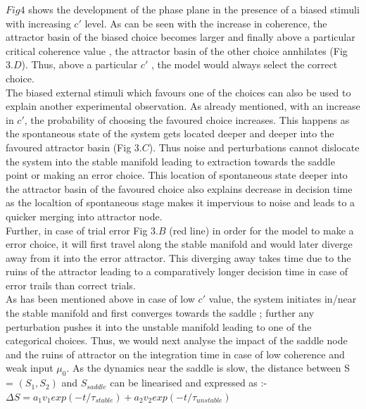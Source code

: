 $Fig 4$ shows the development of the phase plane in the presence of a biased stimuli with increasing $c \prime $ level. As can be seen with the increase in coherence, the  attractor basin of the biased choice becomes larger and finally above a particular critical coherence value , the attractor basin of the other choice annhilates (Fig $ 3.D$). Thus, above a particular $c \prime$ , the model would always select the correct choice. \\

The biased external stimuli which favours one of the choices can also be used to explain another experimental observation. As already mentioned, with an increase in $c \prime$, the probability of choosing the favoured choice increases. This happens as the spontaneous state of the system gets located deeper and deeper into the favoured attractor basin (Fig $3.C$). Thus noise and perturbations cannot dislocate the system into the stable manifold leading to extraction towards the saddle point or making an error choice. This location of spontaneous state deeper into the attractor basin of the favoured choice also explains decrease in decision time as the localtion of spontaneous stage makes it impervious to noise and leads to a quicker merging into attractor node. \\

Further, in case of trial error Fig $3.B$ (red line) in order for the model to make a error choice, it will first travel along the stable manifold and would later diverge away from it into the error attractor. This diverging away takes time due to the ruins of the attractor \cite{hubbard2012differential} leading to a comparatively longer decision time in case of error trails than correct trials.\\

As has been mentioned above in case of low $c \prime$ value, the system initiates in/near the stable manifold and first converges towards the saddle ; further any perturbation pushes it into the unstable manifold leading to one of the categorical choices. Thus, we would next analyse the impact of the saddle node and the ruins of attractor on the integration time in case of low coherence and weak input $\mu_{0}$. As the dynamics near the saddle is slow, the distance between S = $(S_{1}, S_{2})$ and $S_{saddle}$ can be linearised and expressed as :-\\

\indent $\Delta S = a_{1}v_{1}exp(-t/\tau_{stable}) + a_{2}v_{2}exp(-t/\tau_{unstable})$\\

